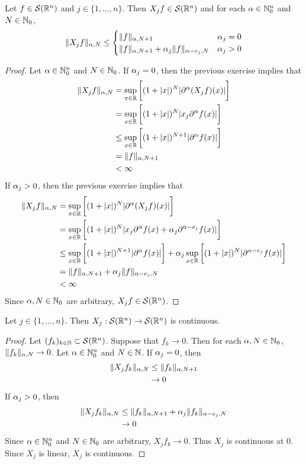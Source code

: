 \documentclass{book}
\begin{document}
	\begin{ex}
		Let $f \in \mathcal{S}(\mathbb{R}^n)$ and $j \in \{1, \ldots, n\}$. Then $X_jf \in \mathcal{S}(\mathbb{R}^n)$ and for each $\alpha \in \mathbb{N}_0^n$ and $N \in \mathbb{N}_0$, 
		\[
		\|X_jf \|_{\alpha, N} \leq 
		\begin{cases}
			\|f\|_{\alpha, N+1} & \alpha_j = 0 \\
			\|f\|_{\alpha, N+1} + \alpha_j \|f\|_{\alpha - e_j, N} & \alpha_j > 0
		\end{cases}
		\] 
	\end{ex}
	
	\begin{proof}
		Let $\alpha  \in \mathbb{N}_0^n$ and $N \in \mathbb{N}_0$. If $\alpha_j = 0$, then the previous exercise implies that  
		\begin{align*}
			\|X_j f\|_{\alpha, N}
			& = \sup_{x \in \mathbb{R}}\bigg[ (1 + |x|)^N|\partial^{\alpha}(X_jf)(x)| \bigg] \\
			& = \sup_{x \in \mathbb{R}}\bigg[ (1 + |x|)^N|x_j\partial^{\alpha}f(x)| \bigg] \\
			& \leq \sup_{x \in \mathbb{R}}\bigg[ (1 + |x|)^{N+1}|\partial^{\alpha}f(x)| \bigg] \\
			& = \|f\|_{\alpha, N+1} \\
			& < \infty 
		\end{align*}
		If $\alpha_j > 0$, then the previous exercise implies that  
		\begin{align*}
			\|X_j f\|_{\alpha, N}
			& = \sup_{x \in \mathbb{R}}\bigg[ (1 + |x|)^N|\partial^{\alpha}(X_jf)(x)| \bigg] \\
			& = \sup_{x \in \mathbb{R}}\bigg[ (1 + |x|)^N|x_j\partial^{\alpha}f(x) + \alpha_j \partial^{\alpha - e_j} f(x)| \bigg] \\
			& \leq \sup_{x \in \mathbb{R}}\bigg[ (1 + |x|)^{N+1}|\partial^{\alpha}f(x)| \bigg] + \alpha_j \sup_{x \in \mathbb{R}}\bigg[  (1 + |x|)^N |\partial^{\alpha-e_j} f(x)| \bigg] \\
			& = \|f\|_{\alpha, N+1} + \alpha_j \|f\|_{\alpha-e_j, N} \\
			& < \infty
		\end{align*}
		Since $\alpha, N \in \mathbb{N}_0$ are arbitrary, $X_jf \in \mathcal{S}(\mathbb{R}^n)$.
	\end{proof}

	\begin{ex}
		Let $j \in \{1, \ldots, n\}$. Then $X_j: \mathcal{S}(\mathbb{R}^n) \rightarrow \mathcal{S}(\mathbb{R}^n)$ is continuous.
	\end{ex}

	\begin{proof} 
		 Let $(f_k)_{k \in \mathbb{N}} \subset \mathcal{S}(\mathbb{R}^n)$. Suppose that $f_k \rightarrow 0$. Then for each $\alpha, N \in \mathbb{N}_0$, $\|f_k\|_{\alpha, N} \rightarrow 0$. Let $\alpha \in \mathbb{N}_0^n$ and $N \in \mathbb{N}$. If $\alpha_j = 0$, then 
		\begin{align*}
			\|X_jf_k\|_{\alpha, N} 
			& \leq \|f_k\|_{\alpha, N+1} \\
			& \rightarrow 0
		\end{align*}
		If $\alpha_j > 0$, then 
		\begin{align*}
			\|X_jf_k\|_{\alpha, N} 
			& \leq \|f_k\|_{\alpha, N+1} + \alpha_j\|f_k\|_{\alpha - e_j, N}\\
			& \rightarrow 0
		\end{align*}
		Since $\alpha \in \mathbb{N}_0^n$ and $N \in \mathbb{N}_0$ are arbitrary, $X_jf_k \rightarrow 0$. Thus $X_j$ is continuous at $0$. Since $X_j$ is linear, $X_j$ is continuous.
	\end{proof}
\end{document}

